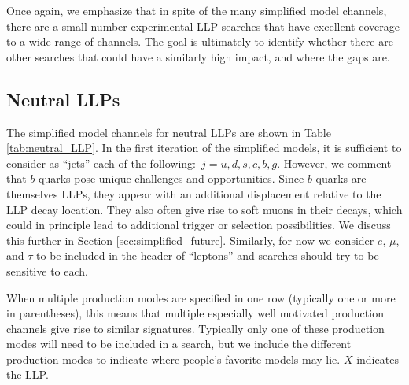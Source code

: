 Once again, we emphasize that in spite of the many simplified model channels, there are a small number experimental LLP searches that have excellent coverage to a wide range of channels. The goal is ultimately to identify whether there are other searches that could have a similarly high impact, and where the gaps are.

\subsection{Neutral LLPs}

The simplified model channels for neutral LLPs are shown in Table \ref{tab:neutral_LLP}. In the first iteration of the simplified models, it is sufficient to consider as ``jets'' each of the following:~$j=u,d,s,c,b,g$. However, we comment that $b$-quarks pose unique challenges and opportunities. Since $b$-quarks are themselves LLPs, they appear with an additional displacement relative to the LLP decay location. They also often give rise to soft muons in their decays, which could in principle lead to additional trigger or selection possibilities. We discuss this further in Section \ref{sec:simplified_future}. Similarly, for now we consider $e$, $\mu$, and $\tau$ to be included  in the header of ``leptons'' and searches should try to be sensitive to each.
 

When multiple production modes are specified in one row (typically one or more in parentheses), this means that multiple especially well motivated production channels give rise to similar signatures. Typically only one of these production modes will need to be included in a search, but we include the different production modes to indicate where people's favorite models may lie. $X$ indicates the LLP.

